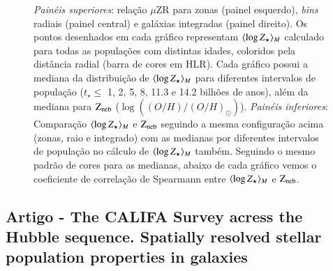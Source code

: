 \begin{figure}
	\centering
	\caption[Relação $\mu$ZR e comparação entre as metalicidades.]
	{\emph{Painéis superiores}: relação $\mu$ZR para zonas (painel esquerdo), {\em bins} radiais
(painel central) e galáxias integradas (painel direito). Os pontos desenhados em cada gráfico
representam $\meanM{\log Z_\star}$ calculado para todas as populações com distintas idades,
coloridos pela distância radial (barra de cores em HLR). Cada gráfico possui a mediana da
distribuição de $\meanM{\log Z_\star}$ para diferentes intervalos de população ($t_\star \leq$ 1,
2, 5, 8, 11.3 e 14.2 bilhões de anos), além da mediana para $\mathrm{Z}_{\mathrm{neb}}$
($\log\left((O/H)/(O/H)_\odot\right)$). \emph{Painéis inferiores}: Comparação $\meanM{\log Z_\star}$
e $\mathrm{Z}_{\mathrm{neb}}$ seguindo a mesma configuração acima (zonas, raio e integrado) com as medianas por diferentes
intervalos de população no cálculo de $\meanM{\log Z_\star}$ também. Seguindo o mesmo padrão de
cores para as medianas, abaixo de cada gráfico vemos o coeficiente de correlação de Spearmann entre
$\meanM{\log Z_\star}$ e $\mathrm{Z}_{\mathrm{neb}}$.}
	\label{fig:ZstarvsZneb}
\end{figure}

\subsection{Artigo - The CALIFA Survey acress the Hubble sequence. Spatially resolved stellar
population properties in galaxies}

